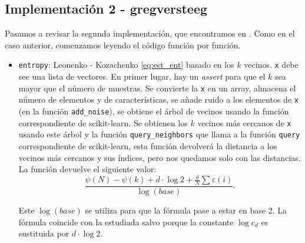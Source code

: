 \documentclass[10pt,a4paper]{article} %
\theoremstyle{definition}
\begin{document}
\subsection{Implementación 2 -  gregversteeg}

Pasamos a revisar la segunda implementación, que encontramos en \cite{npeet}. Como en el caso anterior, comenzamos leyendo el código función por función. 
\begin{itemize}
\item \texttt{entropy}: Leonenko - Kozachenko \ref{eq:est_ent} basado en los $k$ vecinos. \texttt{x} debe see una lista de vectores. En primer lugar, hay un \textit{assert} para que el $k$ sea mayor que el número de muestras. Se convierte la \texttt{x} en un array, almacena el número de elementos y de características, se añade ruido a los elementos de \texttt{x} (en la función \texttt{add\_noise}), se obtiene el árbol de vecinos usando la función correspondiente de scikit-learn. Se obtienen los $k$ vecinos más cercanos de \texttt{x} usando este árbol y la función \texttt{query\_neighbors} que llama a la función \texttt{query} correspondiente de scikit-learn, esta función devolverá la distancia a los vecinos más cercanos y sus índices, pero nos quedamos solo con las distancias. La función devuelve el siguiente valor:\[
  \frac{\psi(N) - \psi(k) + d \cdot \log 2 + \frac{d}{N}\sum \varepsilon(i)}{\log(base)}.
  \]

  Este $\log (base)$ se utiliza para que la fórmula pase a estar en base 2. La fórmula coincide con la estudiada salvo porque la constante $\log c_d$ es sustituida por $d \cdot \log 2$.


\end{itemize}
\end{document}
